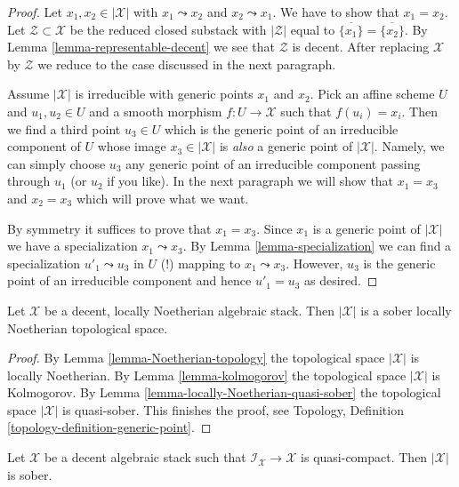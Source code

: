 \begin{proof}
Let $x_1, x_2 \in |\mathcal{X}|$ with $x_1 \leadsto x_2$ and
$x_2 \leadsto x_1$. We have to show that $x_1 = x_2$.
Let $\mathcal{Z} \subset \mathcal{X}$ be the reduced closed
substack with $|\mathcal{Z}|$ equal to
$\overline{\{x_1\}} = \overline{\{x_2\}}$.
By Lemma \ref{lemma-representable-decent}
we see that $\mathcal{Z}$ is decent.
After replacing $\mathcal{X}$ by $\mathcal{Z}$ we reduce to
the case discussed in the next paragraph.

\medskip\noindent
Assume $|\mathcal{X}|$ is irreducible with generic points
$x_1$ and $x_2$. Pick an affine scheme $U$ and $u_1, u_2 \in U$
and a smooth morphism $f : U \to \mathcal{X}$ such that
$f(u_i) = x_i$. Then we find a third point $u_3 \in U$
which is the generic point of an irreducible component of $U$
whose image $x_3 \in |\mathcal{X}|$ is {\it also} a
generic point of $|\mathcal{X}|$. Namely, we can simply
choose $u_3$ any generic point of an irreducible component
passing through $u_1$ (or $u_2$ if you like).
In the next paragraph we will show that $x_1 = x_3$ and $x_2 = x_3$
which will prove what we want.

\medskip\noindent
By symmetry it suffices to prove that $x_1 = x_3$. Since $x_1$
is a generic point of $|\mathcal{X}|$ we have a specialization
$x_1 \leadsto x_3$.
By Lemma \ref{lemma-specialization} we can find a specialization
$u'_1 \leadsto u_3$ in $U$ (!) mapping to $x_1 \leadsto x_3$.
However, $u_3$ is the generic point of an irreducible component
and hence $u'_1 = u_3$ as desired.
\end{proof}

\begin{lemma}
\label{lemma-decent-locally-noetherian-sober}
Let $\mathcal{X}$ be a decent, locally Noetherian algebraic stack.
Then $|\mathcal{X}|$ is a sober locally Noetherian topological space.
\end{lemma}

\begin{proof}
By Lemma \ref{lemma-Noetherian-topology} the topological space $|\mathcal{X}|$
is locally Noetherian. By Lemma \ref{lemma-kolmogorov} the topological space
$|\mathcal{X}|$ is Kolmogorov. By
Lemma \ref{lemma-locally-Noetherian-quasi-sober} the topological space
$|\mathcal{X}|$ is quasi-sober. This finishes the proof, see
Topology, Definition \ref{topology-definition-generic-point}.
\end{proof}

\begin{proposition}
\label{proposition-decent-sober}
Let $\mathcal{X}$ be a decent algebraic stack such that
$\mathcal{I}_\mathcal{X} \to \mathcal{X}$ is quasi-compact.
Then $|\mathcal{X}|$ is sober.
\end{proposition}

